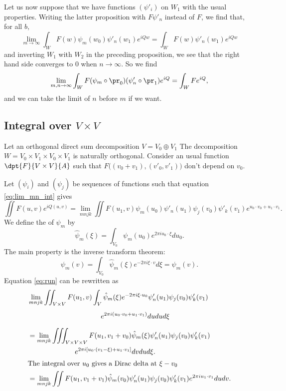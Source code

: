 Let us now suppose that we have functions $(\psi'_i)$ on $W_1$ with the usual properties. Writing the latter proposition with $F\psi'_n$ instead of $F$, we find that, for all $b$,
\[
	\lim_{m\to\infty}\int_WF(w)\psi_m(w_0)\psi'_n(w_1)e^{iQw}=\int_WF(w)\psi'_n(w_1)e^{iQw}
\]
and inverting $W_1$ with $W_2$ in the preceding proposition, we see that the right hand side converges to $0$ when $n\to\infty$. So we find
\begin{equation} \label{eq:lim_mn_int}
	\lim_{m,n\to\infty}\int_WF(\psi_m\circ\pr_0)(\psi'_n\circ\pr_1)e^{iQ}=\int_WFe^{iQ},
\end{equation}
and we can take the limit of $n$ before $m$ if we want.


\subsection{Integral over \texorpdfstring{$V\times V$}{VV}}

Let an orthogonal direct sum decomposition $V=V_0\oplus V_1$ The decomposition $W=V_0\times V_1\times V_0\times V_1$ is naturally orthogonal. Consider an usual function $\dpt{F}{V\times V}{A}$ such that $F\big( (v_0+v_1),(v'_0,v'_1) \big)$ don't depend on $v_0$.

Let $(\psi_i)$ and $(\psi_j)$ be sequences of functions such that equation \eqref{eq:lim_mn_int} gives
\begin{equation} \label{eq:run}
	\iint F(u,v)e^{iQ(u,v)}=\lim_{mnjk}\iint F(u_1,v)\psi_m(u_0)\psi'_n(u_1)\psi_j(v_0)\psi'_k(v_1)e^{u_0\cdot v_0+u_1\cdot v_1}.
\end{equation}
We define the  of $\psi_m$ by
\[
	\hat\psi_m(\xi)=\int_{V_0}\psi_m(u_0)e^{2\pi i u_0\cdot\xi}du_0.
\]
The main property is the inverse transform theorem:
\[
	\psi_m(v)=\int_{V_0}\hat\psi_m(\xi)e^{-2\pi i\xi\cdot v}d\xi=\psi_m(v).
\]
%
Equation \eqref{eq:run} can be rewritten as
\newcommand{\pheqrdeuxun}{\lim_{mnjk}\iint_{V\times V}F(u_1,v)\int_V}
\newcommand{\pheqrdeuxdeux}{\lim_{mnjk}\iiint_{V\times V\times V}F(u_1,v_1+v_0)}
\begin{equation} \label{eq:rdeux}
	\begin{split}
		&\pheqrdeuxun\hat\psi_m(\xi)e^{-2\pi i\xi\cdot u_0}\psi'_n(u_1)\psi_j(v_0)\psi'_k(v_1)\\
		&\phantom{\pheqrdeuxun}e^{2\pi i(u_0\cdot v_0+u_1\cdot v_1)}dudud\xi\\
		&=\pheqrdeuxdeux\hat\psi_m(\xi)\psi'_n(u_1)\psi_j(v_0)\psi'_k(v_1)\\
		&\phantom{pheqrdeuxdeux}e^{2\pi i[u_0\cdot(v_1-\xi)+u_1\cdot v_1]}dvdud\xi.\\
		\intertext{The integral over $u_0$ gives a Dirac delta at $\xi-v_0$}
		&=\lim_{mnjk}\iint F(u_1,v_1+v_1)\hat\psi_m(v_0)\psi'_n(u_1)\psi_j(v_0)\psi'_k(v_1)e^{2\pi i u_1\cdot v_1}dudv.
	\end{split}
\end{equation}

